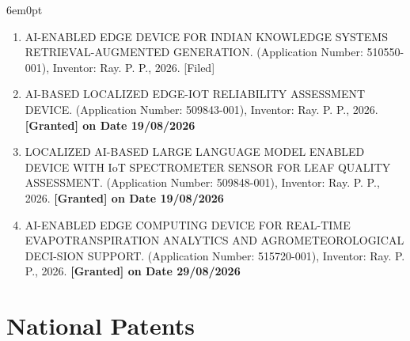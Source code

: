 \documentclass[11pt,a4paper]{moderncv}
\begin{document}
\begin{adjustwidth}{6em}{0pt}
	\begin{enumerate}
		
		\item AI-ENABLED EDGE DEVICE FOR INDIAN KNOWLEDGE SYSTEMS RETRIEVAL-AUGMENTED GENERATION. (Application Number: 510550-001), Inventor: Ray. P. P., 2026. [Filed]
		
		\item AI-BASED LOCALIZED EDGE-IOT RELIABILITY ASSESSMENT DEVICE. (Application Number: 509843-001), Inventor: Ray. P. P., 2026. \textbf{[Granted] on Date 19/08/2026}
		
		\item LOCALIZED AI-BASED LARGE LANGUAGE MODEL ENABLED DEVICE WITH IoT SPECTROMETER SENSOR FOR LEAF QUALITY ASSESSMENT. (Application Number: 509848-001), Inventor: Ray. P. P., 2026. \textbf{[Granted] on Date 19/08/2026}
		
		\item AI-ENABLED EDGE COMPUTING DEVICE FOR REAL-TIME EVAPOTRANSPIRATION ANALYTICS AND AGROMETEOROLOGICAL DECI-SION SUPPORT. (Application Number: 515720-001), Inventor: Ray. P. P., 2026.  \textbf{[Granted] on Date 29/08/2026}	
		
		
		
		
	\end{enumerate}
\end{adjustwidth}





\section{\textbf{National Patents}}
\end{document}
